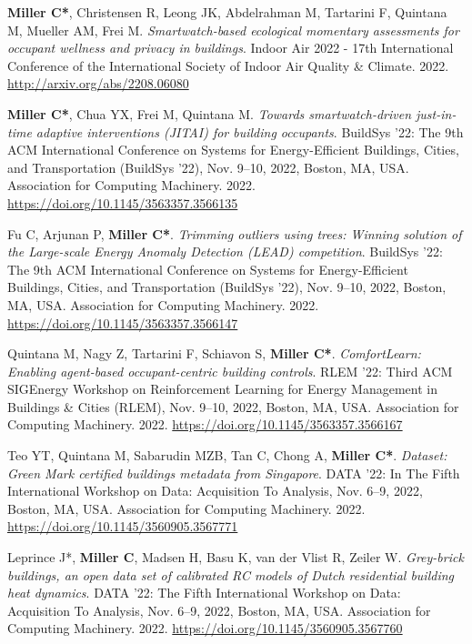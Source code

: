\documentclass[10pt,a4paper]{article}
\begin{document}
\begin{small}
\begin{etaremune}
\item
\textbf{Miller C*}, Christensen R, Leong JK, Abdelrahman M, Tartarini F, Quintana M, Mueller AM, Frei M. \emph{Smartwatch-based ecological momentary assessments for occupant wellness and privacy in buildings}. Indoor Air 2022 - 17th International Conference of the International Society of Indoor Air Quality \& Climate. 2022. \url{http://arxiv.org/abs/2208.06080}%
\item
\textbf{Miller C*}, Chua YX, Frei M, Quintana M. \emph{Towards smartwatch-driven just-in-time adaptive interventions (JITAI) for building occupants}. BuildSys '22: The 9th ACM International Conference on Systems for Energy-Efficient Buildings, Cities, and Transportation (BuildSys ’22), Nov. 9–10, 2022, Boston, MA, USA. Association for Computing Machinery. 2022. \url{https://doi.org/10.1145/3563357.3566135}
\item
Fu C, Arjunan P, \textbf{Miller C*}. \emph{Trimming outliers using trees: Winning solution of the Large-scale Energy Anomaly Detection (LEAD) competition}. BuildSys '22: The 9th ACM International Conference on Systems for Energy-Efficient Buildings, Cities, and Transportation (BuildSys ’22), Nov. 9–10, 2022, Boston, MA, USA. Association for Computing Machinery. 2022. \url{https://doi.org/10.1145/3563357.3566147}
\item
Quintana M, Nagy Z, Tartarini F, Schiavon S, \textbf{Miller C*}. \emph{ComfortLearn: Enabling agent-based occupant-centric building controls}. RLEM ’22: Third ACM SIGEnergy Workshop on Reinforcement Learning for Energy Management in Buildings \& Cities (RLEM), Nov. 9–10, 2022, Boston, MA, USA. Association for Computing Machinery. 2022. \url{https://doi.org/10.1145/3563357.3566167}
\item
Teo YT, Quintana M, Sabarudin MZB, Tan C, Chong A, \textbf{Miller C*}. \emph{Dataset: Green Mark certified buildings metadata from Singapore}. DATA '22: In The Fifth International Workshop on Data: Acquisition To Analysis, Nov. 6–9, 2022, Boston, MA, USA. Association for Computing Machinery. 2022. \url{https://doi.org/10.1145/3560905.3567771}
\item
Leprince J*, \textbf{Miller C}, Madsen H, Basu K, van der Vlist R, Zeiler W. \emph{Grey-brick buildings, an open data set of calibrated RC models of Dutch residential building heat dynamics}. DATA '22: The Fifth International Workshop on Data: Acquisition To Analysis, Nov. 6–9, 2022, Boston, MA, USA. Association for Computing Machinery. 2022. \url{https://doi.org/10.1145/3560905.3567760}

\end{etaremune}
\end{small}
\end{document}
